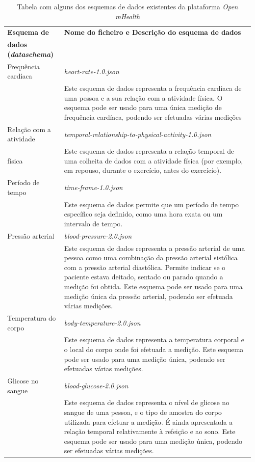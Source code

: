 \begin{table}[H]
\centering
\label{t:schemaslist}
\begin{tabularx}{1\textwidth}{p{4cm} p{10.7cm}}
 \textbf{Esquema de }  &   \textbf{Nome do ficheiro e Descrição do esquema de dados}  \\
 \textbf{dados (\textit{dataschema})} & \\
\hline
Frequência cardíaca & \textit{heart-rate-1.0.json} \\ 
& Este esquema de dados representa a frequência cardíaca de uma pessoa e a sua relação com a atividade física. O esquema pode ser usado para uma única medição de frequência cardíaca, podendo ser efetuadas várias medições\\ \hline

Relação com a atividade & \textit{temporal-relationship-to-physical-activity-1.0.json} \\
física& Este esquema de dados representa a relação temporal de uma colheita de dados com a atividade física (por exemplo, em repouso, durante o exercício, antes do exercício). \\ \hline

Período de tempo & \textit{time-frame-1.0.json} \\
& Este esquema de dados permite que um período de tempo específico seja definido, como uma hora exata ou um intervalo de tempo. \\ \hline

Pressão arterial & \textit{blood-pressure-2.0.json} \\ 
& Este esquema de dados representa a pressão arterial de uma pessoa como uma combinação da pressão arterial sistólica com a pressão arterial diastólica. Permite indicar se o paciente estava deitado, sentado ou parado quando a medição foi obtida. Este esquema pode ser usado para uma medição única da pressão arterial, podendo ser efetuada várias medições. \\ \hline

Temperatura do corpo & \textit{body-temperature-2.0.json} \\
& Este esquema de dados representa a temperatura corporal e o local do corpo onde foi efetuada a medição. Este esquema pode ser usado para uma medição única, podendo ser efetuadas várias medições. \\ \hline

Glicose no sangue & \textit{blood-glucose-2.0.json} \\ 
& Este esquema de dados representa o nível de glicose no sangue de uma pessoa, e o tipo de amostra do corpo utilizada para efetuar a medição. É ainda apresentada a relação temporal relativamente à refeição e ao sono. Este esquema pode ser usado para uma medição única, podendo ser efetuadas várias medições.
                 
\end{tabularx}
\caption{Tabela com alguns dos esquemas de dados existentes da plataforma \textit{Open mHealth}}
\end{table}



